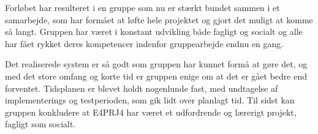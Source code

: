 Forløbet har resulteret i en gruppe som nu er stærkt bundet sammen i et samarbejde, som har formået at løfte hele projektet og gjort det muligt at komme så langt. 
Gruppen har været i konstant udvikling både fagligt og socialt og alle har fået rykket deres kompetencer indenfor gruppearbejde endnu en gang.

Det realiserede system er så godt som gruppen har kunnet formå at gøre det, og med det store omfang og korte tid er gruppen enige om at det er gået bedre end forventet. 
Tidsplanen er blevet holdt nogenlunde fast, med undtagelse af implementerings og testperioden, som gik lidt over planlagt tid. 
Til sidst kan gruppen konkludere at E4PRJ4 har været et udfordrende og lærerigt projekt, fagligt som socialt.

\clearpage